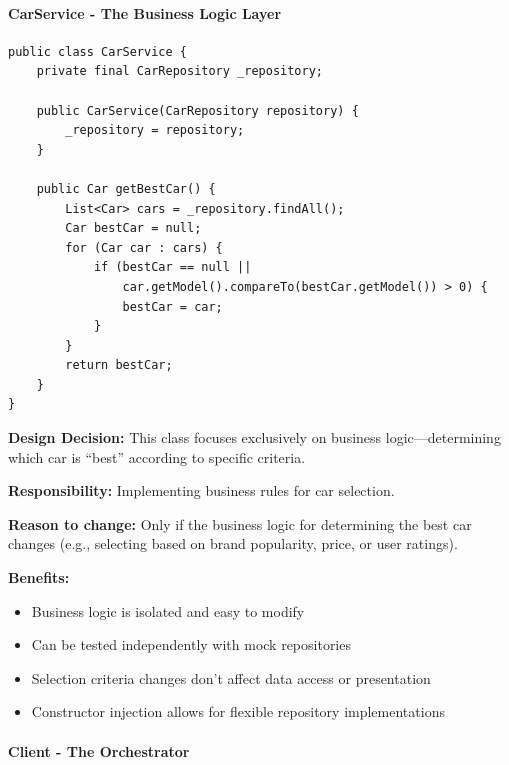 \paragraph{CarService - The Business Logic Layer}

\begin{verbatim}
public class CarService {
    private final CarRepository _repository;
    
    public CarService(CarRepository repository) {
        _repository = repository;
    }
    
    public Car getBestCar() {
        List<Car> cars = _repository.findAll();
        Car bestCar = null;
        for (Car car : cars) {
            if (bestCar == null || 
                car.getModel().compareTo(bestCar.getModel()) > 0) {
                bestCar = car;
            }
        }
        return bestCar;
    }
}
\end{verbatim}

\textbf{Design Decision:} This class focuses exclusively on business logic—determining which car is ``best'' according to specific criteria.

\textbf{Responsibility:} Implementing business rules for car selection.

\textbf{Reason to change:} Only if the business logic for determining the best car changes (e.g., selecting based on brand popularity, price, or user ratings).

\textbf{Benefits:}
\begin{itemize}
    \item Business logic is isolated and easy to modify
    \item Can be tested independently with mock repositories
    \item Selection criteria changes don't affect data access or presentation
    \item Constructor injection allows for flexible repository implementations
\end{itemize}

\paragraph{Client - The Orchestrator}

